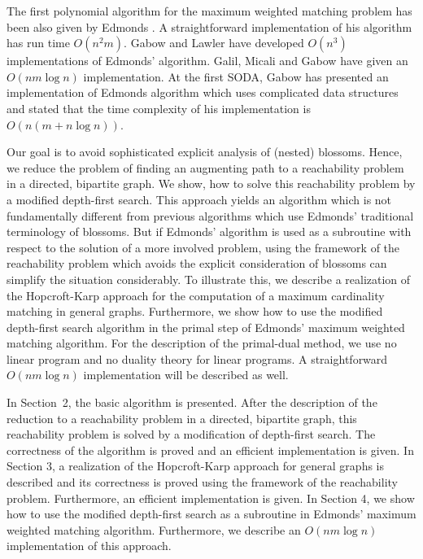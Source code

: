 \documentclass[12pt,twoside,a4paper]{article}
\begin{document}
The first polynomial algorithm for the maximum weighted matching problem has been also 
given by Edmonds \cite{Ed2}. A straightforward implementation of his algorithm has run 
time $O(n^2m)$. Gabow \cite{Ga1} and Lawler \cite{La} have developed $O(n^3)$ 
implementations of Edmonds' algorithm. Galil, Micali and Gabow \cite{GaMiGa} have given 
an $O(nm \log n)$ implementation. At the first SODA, Gabow \cite{Ga2} has
presented an implementation of Edmonds algorithm which uses complicated data structures
and stated that the time complexity of his implementation is $O(n(m + n \log n))$. 

Our goal is to avoid sophisticated explicit analysis of (nested) blossoms.
Hence, we reduce the problem of finding an augmenting path to a reachability 
problem in a directed, bipartite graph. We show, how to solve this reachability 
problem by a modified depth-first search. This approach yields an algorithm which is not
fundamentally different from previous algorithms which use Edmonds' traditional
terminology of blossoms. But if Edmonds' algorithm is used as a subroutine with respect
to the solution of a more involved problem, using the framework of the reachability
problem which avoids the explicit consideration of blossoms can simplify the situation 
considerably. To illustrate this, we describe a realization of the Hopcroft-Karp approach 
\cite{HK} for the 
computation of a maximum cardinality matching in general graphs. Furthermore, we show how 
to use the modified depth-first search algorithm in the primal step of Edmonds' maximum 
weighted matching algorithm. For the description of the primal-dual method, we use no 
linear program and no duality theory for linear programs. 
A straightforward $O(nm \log n)$ implementation will be described as well.

In Section~2, the basic algorithm is presented. After the description of
the reduction to a reachability problem in a directed, bipartite graph, this 
reachability problem is solved by a modification of depth-first search.
The correctness of the algorithm is proved and an efficient implementation
is given. In Section 3, a realization of the Hopcroft-Karp approach for general graphs
is described and its correctness is proved using the framework of the reachability 
problem. Furthermore, an efficient implementation is given.
In Section 4, we show how to use the modified depth-first search as a subroutine in Edmonds' 
maximum weighted matching algorithm. Furthermore, we describe an $O(nm \log n)$
implementation of this approach.
\end{document}
